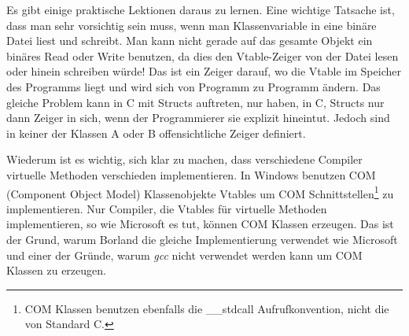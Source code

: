 

Es gibt einige praktische Lektionen daraus zu lernen. Eine wichtige
Tatsache ist, dass man sehr vorsichtig sein muss, wenn man
Klassenvariable in eine bin\"{a}re Datei liest und schreibt. Man kann
nicht gerade auf das gesamte Objekt ein bin\"{a}res Read oder Write
benutzen, da dies den Vtable-Zeiger von der Datei lesen oder hinein
schreiben w\"{u}rde! Das ist ein Zeiger darauf, wo die Vtable im
Speicher des Programms liegt und wird sich von Programm zu Programm
\"{a}ndern. Das gleiche Problem kann in C mit Structs auftreten, nur
haben, in C, Structs nur dann Zeiger in sich, wenn der Programmierer
sie explizit hineintut. Jedoch sind in keiner der Klassen {\code A}
oder {\code B} offensichtliche Zeiger definiert.

Wiederum ist es wichtig, sich klar zu machen, dass verschiedene
Compiler virtuelle Methoden verschieden implementieren. In Windows
benutzen COM (Component Object Model)  Klassenobjekte
Vtables um COM Schnittstellen\footnote{COM Klassen benutzen
ebenfalls die {\code \_\_stdcall} 
Aufrufkonvention, nicht die von Standard C.} zu implementieren. Nur
Compiler, die Vtables f\"{u}r virtuelle Methoden implementieren, so wie
Microsoft es tut, k\"{o}nnen COM Klassen erzeugen. Das ist der Grund,
warum Borland  die gleiche Implementierung
verwendet wie Microsoft  und einer der
Gr\"{u}nde, warum \emph{gcc}  nicht verwendet werden
kann um COM Klassen zu erzeugen.

